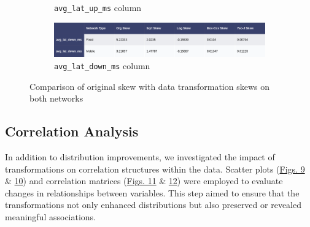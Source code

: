 \documentclass[
  letterpaper,
  DIV=11,
  numbers=noendperiod,
  oneside]{scrartcl}
\begin{document}
\begin{figure}
{\begin{figure}
\caption{\texttt{avg\_lat\_up\_ms} column}

\end{figure}

\begin{figure}

{\centering \includegraphics{tskew_down.png}

}

\caption{\texttt{avg\_lat\_down\_ms} column}

\end{figure}

}

\caption{\label{fig-transskews}Comparison of original skew with data
transformation skews on both networks}

\end{figure}

\hypertarget{correlation-analysis}{%
\subsection{Correlation Analysis}\label{correlation-analysis}}

In addition to distribution improvements, we investigated the impact of
transformations on correlation structures within the data. Scatter plots
(\protect\hyperlink{fig-orgpairs}{Figs. 9} \&
\protect\hyperlink{fig-transpairs}{10}) and correlation matrices
(\protect\hyperlink{fig-orgheatmaps}{Figs. 11} \&
\protect\hyperlink{fig-transheatmaps}{12}) were employed to evaluate
changes in relationships between variables. This step aimed to ensure
that the transformations not only enhanced distributions but also
preserved or revealed meaningful associations.
\end{document}

